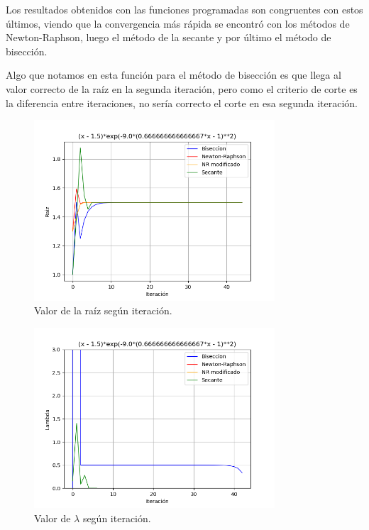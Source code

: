 \documentclass[titlepage,a4paper]{article}
\begin{document}
Los resultados obtenidos con las funciones programadas son congruentes con estos últimos, viendo que la convergencia más rápida se encontró con los métodos de Newton-Raphson, luego el método de la secante y por último el método de bisección. 

Algo que notamos en esta función para el método de bisección es que llega al valor correcto de la raíz en la segunda iteración, pero como el criterio de corte es la diferencia entre iteraciones, no sería correcto el corte en esa segunda iteración.


\begin{figure}[H]
    \centering
    \includegraphics[width=0.8\textwidth]{raiz f3.png}
    \caption{\label{fig:raizf3}Valor de la raíz según iteración.}
\end{figure}

\begin{figure}[H]
    \centering
    \includegraphics[width=0.8\textwidth]{lambda f3.png}
    \caption{\label{fig:lambdaf3}Valor de $\lambda$ según iteración.}
\end{figure}
\end{document}
